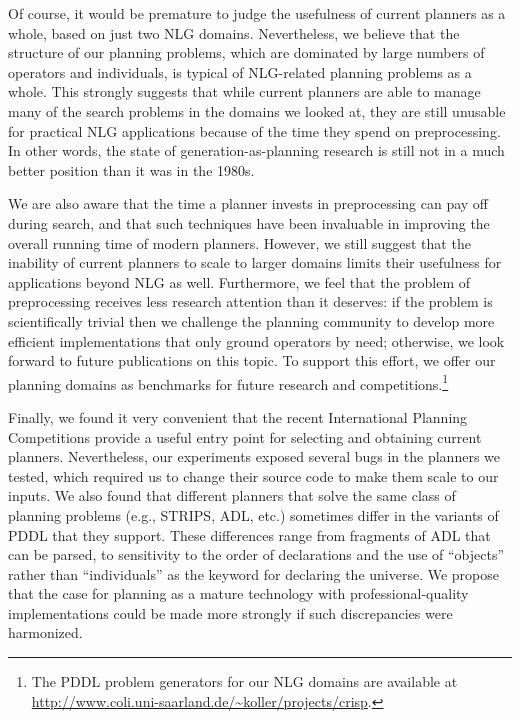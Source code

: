 Of course, it would be premature to judge the usefulness of current planners
as a whole, based on just two NLG domains. Nevertheless, we believe that the
structure of our planning problems, which are dominated by large numbers of
operators and individuals, is typical of NLG-related planning problems as a
whole. This strongly suggests that while current planners are able to manage
many of the search problems in the domains we looked at, they are still
unusable for practical NLG applications because of the time they spend on
preprocessing. In other words, the state of generation-as-planning research
is still not in a much better position than it was in the 1980s. 

We are also aware that the time a planner invests in preprocessing can pay
off during search, and that such techniques have been invaluable in improving
the overall running time of modern planners. However, we still suggest that
the inability of current planners to scale to larger domains limits their
usefulness for applications beyond NLG as well. Furthermore, we feel that the
problem of preprocessing receives less research attention than it deserves:
if the problem is scientifically trivial then we challenge the planning
community to develop more efficient implementations that only ground
operators by need; otherwise, we look forward to future publications on this
topic. To support this effort, we offer our planning domains as benchmarks
for future research and competitions.\footnote{The PDDL problem generators
for our NLG domains are available at
\url{http://www.coli.uni-saarland.de/~koller/projects/crisp}.}

Finally, we found it very convenient that the recent International Planning
Competitions provide a useful entry point for selecting and obtaining current
planners. Nevertheless, our experiments exposed several bugs in the planners
we tested, which required us to change their source code to make them scale
to our inputs. We also found that different planners that solve the same
class of planning problems (e.g., STRIPS, ADL, etc.) sometimes differ in the
variants of PDDL that they support. These differences range from fragments of
ADL that can be parsed, to sensitivity to the order of declarations and the
use of ``objects'' rather than ``individuals'' as the keyword for declaring
the universe. We propose that the case for planning as a mature technology
with professional-quality implementations could be made more strongly if such
discrepancies were harmonized.



